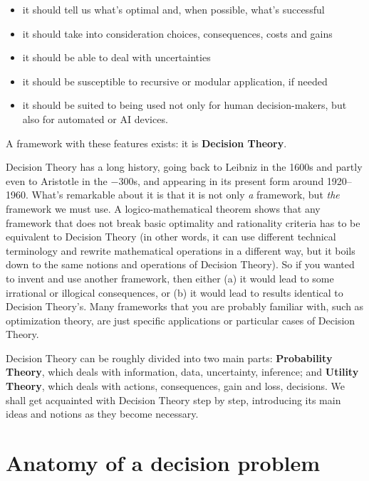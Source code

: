 \documentclass[
  a4paper,
  DIV=11,
  numbers=noendperiod,
  oneside]{scrreprt}
\begin{document}
\begin{itemize}
\item
  it should tell us what's optimal and, when possible, what's successful
\item
  it should take into consideration choices, consequences, costs and
  gains
\item
  it should be able to deal with uncertainties
\item
  it should be susceptible to recursive or modular application, if
  needed
\item
  it should be suited to being used not only for human decision-makers,
  but also for automated or AI devices.
\end{itemize}

A framework with these features exists: it is {\textbf{Decision
Theory}}.

Decision Theory has a long history, going back to Leibniz in the 1600s
and partly even to Aristotle in the −300s, and appearing in its present
form around 1920--1960. What's remarkable about it is that it is not
only \emph{a} framework, but \emph{the} framework we must use. A
logico-mathematical theorem shows that any framework that does not break
basic optimality and rationality criteria has to be equivalent to
Decision Theory (in other words, it can use different technical
terminology and rewrite mathematical operations in a different way, but
it boils down to the same notions and operations of Decision Theory). So
if you wanted to invent and use another framework, then either (a) it
would lead to some irrational or illogical consequences, or (b) it would
lead to results identical to Decision Theory's. Many frameworks that you
are probably familiar with, such as optimization theory, are just
specific applications or particular cases of Decision Theory.

Decision Theory can be roughly divided into two main parts:
{\textbf{Probability Theory}}, which deals with information, data,
uncertainty, inference; and {\textbf{Utility Theory}}, which deals with
actions, consequences, gain and loss, decisions. We shall get acquainted
with Decision Theory step by step, introducing its main ideas and
notions as they become necessary.

\hypertarget{anatomy-of-a-decision-problem}{%
\section{Anatomy of a decision
problem}\label{anatomy-of-a-decision-problem}}
\end{document}

